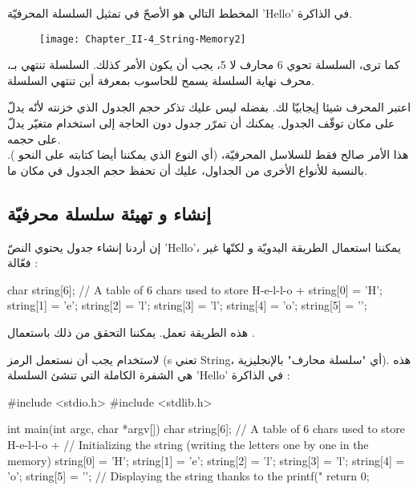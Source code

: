 المخطط التالي هو الأصحّ في تمثيل السلسلة المحرفيّة
'\textenglish{Hello}'
في الذاكرة.

\begin{figure}[H]
	\centering
	\texttt{[image: Chapter\_II-4\_String-Memory2]}
\end{figure}

كما ترى، السلسلة تحوي 6 محارف لا 5، يجب أن يكون الأمر كذلك. السلسلة تنتهي بـ،
محرف نهاية السلسلة يسمح للحاسوب بمعرفة أين تنتهي السلسلة.

اعتبر المحرف
شيئا إيجابيّا لك. بفضله ليس عليك تذكر حجم الجدول الذي خزنته لأنّه يدلّ على مكان توقّف الجدول. يمكنك أن تمرّر جدول
دون الحاجة إلى استخدام متغيّر يدلّ على حجمه.\\
هذا الأمر صالح فقط للسلاسل المحرفيّة، (أي النوع
الذي يمكننا أيضا كتابته على النحو
).
بالنسبة للأنواع الأخرى من الجداول، عليك أن تحفظ حجم الجدول في مكان ما.

\subsection{إنشاء و تهيئة سلسلة محرفيّة}

إن أردنا إنشاء جدول
يحتوي النصّ
'\textenglish{Hello}'،
يمكننا استعمال الطريقة اليدويّة و لكنّها غير فعّالة :

\begin{Csource}
char string[6]; // A table of  6 chars used to store H-e-l-l-o + \0
string[0] = 'H';
string[1] = 'e';
string[2] = 'l';
string[3] = 'l';
string[4] = 'o';
string[5] = '\0';
\end{Csource}

هذه الطريقة تعمل. يمكننا التحقق من ذلك باستعمال
.

لاستخدام
يجب أن نستعمل الرمز
(\textenglish{s}
تعني
\textenglish{String}،
أي "سلسلة محارف" بالإنجليزية). هذه هي الشفرة الكاملة التي تنشئ السلسلة
'\textenglish{Hello}'
في الذاكرة :

\begin{Csource}
#include <stdio.h>
#include <stdlib.h>

int main(int argc, char *argv[])
{
	char string[6]; // A table of 6 chars used to store H-e-l-l-o + \0
	// Initializing the string (writing the letters one by one in the memory)
	string[0] = 'H';
	string[1] = 'e';
	string[2] = 'l';
	string[3] = 'l';
	string[4] = 'o';
	string[5] = '\0';
	// Displaying the string thanks to the %
	printf("%
	return 0;
}
\end{Csource}


